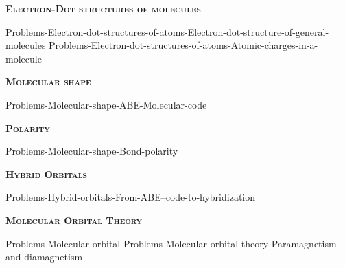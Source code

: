 \documentclass[main.tex]{subfiles}
\newcommand\chapterlabel{Ch-electronicstructure}
\begin{document}
\newpage
\setdoublesep{0.35700 em}  %
\setatomsep{1.78500 em}    %
\setbondoffset{0.18265 em} %
\renewcommand{\bondwidth}{0.06642 em} %
\setbondstyle{line width = \bondwidth}
\fancyhfoffset[E,O]{0pt}
\setlength{\columnsep}{30pt}
\begin{conclusion}
\end{conclusion}






\begin{multicols*}{2}\setcounter{numA}{1}  

{\raggedright\textsc{\textbf{Electron-Dot structures of molecules }}\par}
{Problems-Electron-dot-structures-of-atoms-Electron-dot-structure-of-general-molecules}
{Problems-Electron-dot-structures-of-atoms-Atomic-charges-in-a-molecule}
{\raggedright\textsc{\textbf{Molecular shape}}\par}
{Problems-Molecular-shape-ABE-Molecular-code}


{\raggedright\textsc{\textbf{Polarity}}\par}
{Problems-Molecular-shape-Bond-polarity}
{\raggedright\textsc{\textbf{Hybrid Orbitals}}\par}
{Problems-Hybrid-orbitals-From-ABE--code-to-hybridization}
{\raggedright\textsc{\textbf{Molecular Orbital Theory}}\par}
{Problems-Molecular-orbital}
{Problems-Molecular-orbital-theory-Paramagnetism-and-diamagnetism}


 


\end{multicols*} \iftoggle{showfinalanswers}{
\newpage\fancyhfoffset[E,O]{0pt}
\begin{answerbox}
\begin{answersenvironment}
 \begin{localsize}{10}
{ \checkoddpage\ifoddpage    \else   \clearpage\thispagestyle{empty}\mbox{}\clearpage\fi
\Large \bf Answers}
\SetupExSheets{ headings = inline-nr , counter-format = qu) ,}
\printsolutions 
  \vspace{20cm}
 \end{localsize}
 \end{answersenvironment}
\end{answerbox}
}{}
\checkoddpage\ifoddpage   \clearpage\thispagestyle{empty}\mbox{}\clearpage \else   \fi
\end{document}
